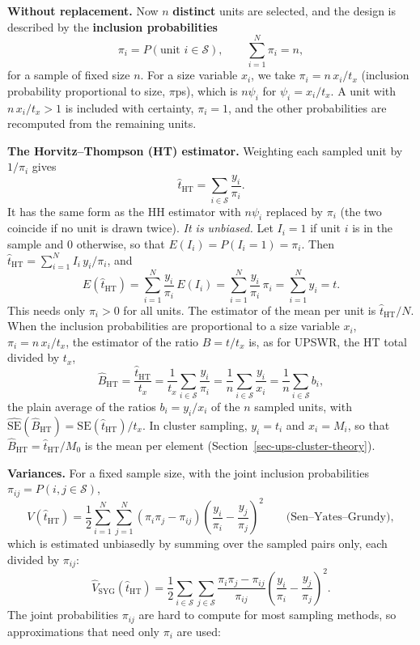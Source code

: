 \documentclass[
  letterpaper,
  DIV=11,
  numbers=noendperiod]{scrreprt}
\renewcommand{\[}{\begin{equation}}
\renewcommand{\]}{\end{equation}}
\begin{document}
\textbf{Without replacement.} Now \(n\) \textbf{distinct} units are
selected, and the design is described by the \textbf{inclusion
probabilities} \[
\pi_i=P(\text{unit } i\in\mathcal{S}),\qquad \sum_{i=1}^N\pi_i=n ,
\] for a sample of fixed size \(n\). For a size variable \(x_i\), we
take \(\pi_i=n\,x_i/t_x\) (inclusion probability proportional to size,
\(\pi\)ps), which is \(n\psi_i\) for \(\psi_i=x_i/t_x\). A unit with
\(n\,x_i/t_x>1\) is included with certainty, \(\pi_i=1\), and the other
probabilities are recomputed from the remaining units.

\textbf{The Horvitz--Thompson (HT) estimator.} Weighting each sampled
unit by \(1/\pi_i\) gives \[
\boxed{\hat{t}_{\mathrm{HT}}=\sum_{i\in\mathcal{S}}\frac{y_i}{\pi_i}} .
\] It has the same form as the HH estimator with \(n\psi_i\) replaced by
\(\pi_i\) (the two coincide if no unit is drawn twice). \emph{It is
unbiased.} Let \(I_i=1\) if unit \(i\) is in the sample and \(0\)
otherwise, so that \(E(I_i)=P(I_i=1)=\pi_i\). Then
\(\hat{t}_{\mathrm{HT}}=\sum_{i=1}^N I_i\,y_i/\pi_i\), and \[
E(\hat{t}_{\mathrm{HT}})=\sum_{i=1}^N\frac{y_i}{\pi_i}\,E(I_i)=\sum_{i=1}^N\frac{y_i}{\pi_i}\,\pi_i=\sum_{i=1}^N y_i=t .
\] This needs only \(\pi_i>0\) for all units. The estimator of the mean
per unit is \(\hat{t}_{\mathrm{HT}}/N\). When the inclusion
probabilities are proportional to a size variable \(x_i\),
\(\pi_i=n\,x_i/t_x\), the estimator of the ratio \(B=t/t_x\) is, as for
UPSWR, the HT total divided by \(t_x\), \[
\hat{B}_{\mathrm{HT}}=\frac{\hat{t}_{\mathrm{HT}}}{t_x}=\frac{1}{t_x}\sum_{i\in\mathcal{S}}\frac{y_i}{\pi_i}
=\frac{1}{n}\sum_{i\in\mathcal{S}}\frac{y_i}{x_i}=\frac{1}{n}\sum_{i\in\mathcal{S}}b_i ,
\] the plain average of the ratios \(b_i=y_i/x_i\) of the \(n\) sampled
units, with
\(\widehat{\mathrm{SE}}(\hat{B}_{\mathrm{HT}})=\widehat{\mathrm{SE}}(\hat{t}_{\mathrm{HT}})/t_x\).
In cluster sampling, \(y_i=t_i\) and \(x_i=M_i\), so that
\(\hat{B}_{\mathrm{HT}}=\hat{t}_{\mathrm{HT}}/M_0\) is the mean per
element (Section~\ref{sec-ups-cluster-theory}).

\textbf{Variances.} For a fixed sample size, with the joint inclusion
probabilities \(\pi_{ij}=P(i,j\in\mathcal{S})\), \[
V(\hat{t}_{\mathrm{HT}})=\frac{1}{2}\sum_{i=1}^N\sum_{j=1}^N(\pi_i\pi_j-\pi_{ij})
\left(\frac{y_i}{\pi_i}-\frac{y_j}{\pi_j}\right)^2
\qquad\text{(Sen--Yates--Grundy)},
\] which is estimated unbiasedly by summing over the sampled pairs only,
each divided by \(\pi_{ij}\): \[
\hat{V}_{\mathrm{SYG}}(\hat{t}_{\mathrm{HT}})=\frac{1}{2}\sum_{i\in\mathcal{S}}\sum_{j\in\mathcal{S}}
\frac{\pi_i\pi_j-\pi_{ij}}{\pi_{ij}}\left(\frac{y_i}{\pi_i}-\frac{y_j}{\pi_j}\right)^2 .
\] The joint probabilities \(\pi_{ij}\) are hard to compute for most
sampling methods, so approximations that need only \(\pi_i\) are used:
\end{document}
